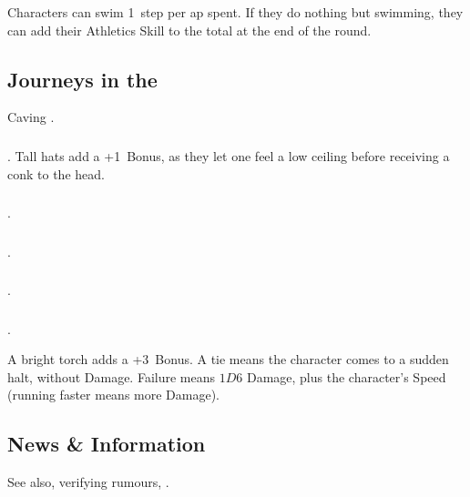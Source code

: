 \begin{multicols}{2}
Characters can swim 1~\gls{step} per \gls{ap} spent.
If they do nothing but swimming, they can add their Athletics Skill to the total at the end of the round.

\subsection{Journeys in the }
Caving .

\subsubsection{}
.
Tall hats add a +1~Bonus, as they let one feel a low ceiling before receiving a conk to the head.

\subsubsection{}
.

\subsubsection{}
.

\subsubsection{}
.

\subsubsection{}
.

%
A bright \gls{torch} adds a +3~Bonus.
A tie means the character comes to a sudden halt, without Damage.
Failure means $1D6$ Damage, plus the character's Speed (running faster means more Damage).

\subsection{News \& Information}

See also, verifying rumours, .


\end{multicols}
